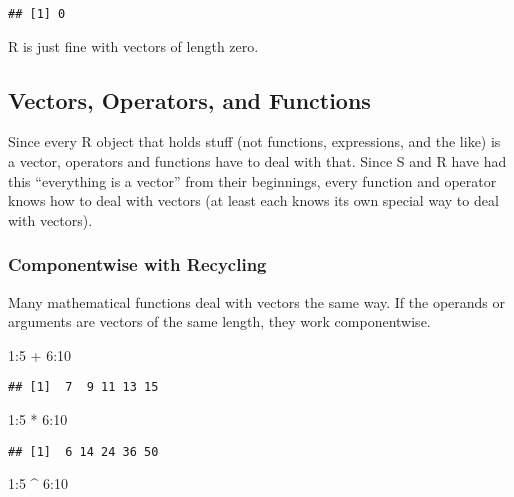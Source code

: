 \documentclass[
]{article}
\newenvironment{Shaded}{\begin{snugshade}}{\end{snugshade}}
\newcommand{\DecValTok}[1]{\textcolor[rgb]{0.00,0.00,0.81}{#1}}
\newcommand{\SpecialCharTok}[1]{\textcolor[rgb]{0.00,0.00,0.00}{#1}}
\begin{document}
\begin{verbatim}
## [1] 0
\end{verbatim}

R is just fine with vectors of length zero.

\hypertarget{vectors-operators-and-functions}{%
\subsection{Vectors, Operators, and
Functions}\label{vectors-operators-and-functions}}

Since every R object that holds stuff (not functions, expressions, and
the like) is a vector, operators and functions have to deal with that.
Since S and R have had this ``everything is a vector'' from their
beginnings, every function and operator knows how to deal with vectors
(at least each knows its own special way to deal with vectors).

\hypertarget{componentwise-with-recycling}{%
\subsubsection{Componentwise with
Recycling}\label{componentwise-with-recycling}}

Many mathematical functions deal with vectors the same way. If the
operands or arguments are vectors of the same length, they work
componentwise.

\begin{Shaded}
\begin{Highlighting}[]
\DecValTok{1}\SpecialCharTok{:}\DecValTok{5} \SpecialCharTok{+} \DecValTok{6}\SpecialCharTok{:}\DecValTok{10}
\end{Highlighting}
\end{Shaded}

\begin{verbatim}
## [1]  7  9 11 13 15
\end{verbatim}

\begin{Shaded}
\begin{Highlighting}[]
\DecValTok{1}\SpecialCharTok{:}\DecValTok{5} \SpecialCharTok{*} \DecValTok{6}\SpecialCharTok{:}\DecValTok{10}
\end{Highlighting}
\end{Shaded}

\begin{verbatim}
## [1]  6 14 24 36 50
\end{verbatim}

\begin{Shaded}
\begin{Highlighting}[]
\DecValTok{1}\SpecialCharTok{:}\DecValTok{5} \SpecialCharTok{\^{}} \DecValTok{6}\SpecialCharTok{:}\DecValTok{10}
\end{Highlighting}
\end{Shaded}
\end{document}
